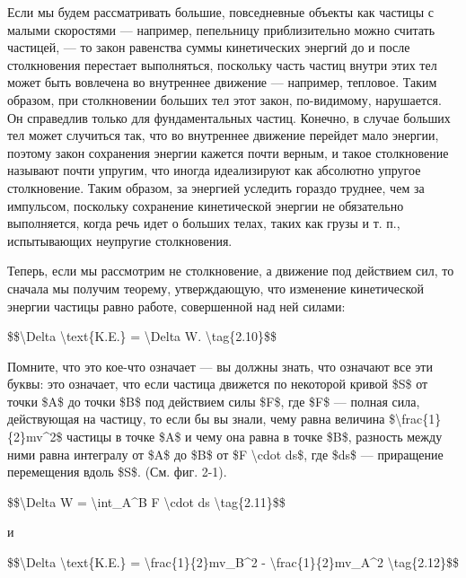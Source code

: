 \documentclass[10pt,oneside]{article}
\newcommand{\TipsSubsection}[1]{\par\vspace{6bp}{\normalsize\bfseries #1\par}\vspace{2bp}}
\begin{document}
Если мы будем рассматривать большие, повседневные объекты как частицы с малыми скоростями --- например, пепельницу приблизительно можно считать частицей, --- то закон равенства суммы кинетических энергий до и после столкновения перестает выполняться, поскольку часть частиц внутри этих тел может быть вовлечена во внутреннее движение --- например, тепловое. Таким образом, при столкновении больших тел этот закон, по-видимому, нарушается. Он справедлив только для фундаментальных частиц. Конечно, в случае больших тел может случиться так, что во внутреннее движение перейдет мало энергии, поэтому закон сохранения энергии кажется почти верным, и такое столкновение называют почти упругим, что иногда идеализируют как абсолютно упругое столкновение. Таким образом, за энергией уследить гораздо труднее, чем за импульсом, поскольку сохранение кинетической энергии не обязательно выполняется, когда речь идет о больших телах, таких как грузы и т. п., испытывающих неупругие столкновения.\par

\TipsSubsection{2-3 Движение под действием сил}

Теперь, если мы рассмотрим не столкновение, а движение под действием сил, то сначала мы получим теорему, утверждающую, что изменение кинетической энергии частицы равно работе, совершенной над ней силами:\par

\$\$\textbackslash{}Delta \textbackslash{}text\{K.E.\} = \textbackslash{}Delta W. \textbackslash{}tag\{2.10\}\$\$\par

Помните, что это кое-что означает --- вы должны знать, что означают все эти буквы: это означает, что если частица движется по некоторой кривой \$S\$ от точки \$A\$ до точки \$B\$ под действием силы \$F\$, где \$F\$ --- полная сила, действующая на частицу, то если бы вы знали, чему равна величина \$\textbackslash{}frac\{1\}\{2\}mv\textasciicircum{}2\$ частицы в точке \$A\$ и чему она равна в точке \$B\$, разность между ними равна интегралу от \$A\$ до \$B\$ от \$F \textbackslash{}cdot ds\$, где \$ds\$ --- приращение перемещения вдоль \$S\$. (См. фиг. 2-1).\par

\$\$\textbackslash{}Delta W = \textbackslash{}int\_A\textasciicircum{}B F \textbackslash{}cdot ds \textbackslash{}tag\{2.11\}\$\$\par

и\par

\$\$\textbackslash{}Delta \textbackslash{}text\{K.E.\} = \textbackslash{}frac\{1\}\{2\}mv\_B\textasciicircum{}2 - \textbackslash{}frac\{1\}\{2\}mv\_A\textasciicircum{}2 \textbackslash{}tag\{2.12\}\$\$\par
\end{document}
